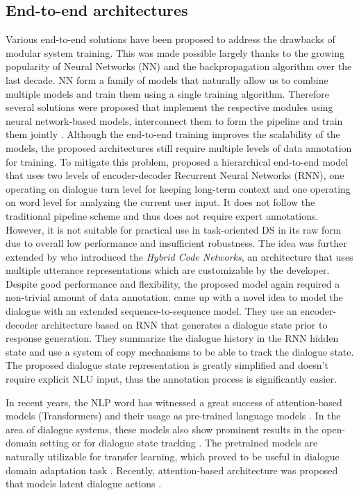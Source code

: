 \subsection{End-to-end architectures}
\label{sec:relwork-end-to-end}
Various end-to-end solutions have been proposed to address the drawbacks of modular system training.
This was made possible largely thanks to the growing popularity of Neural Networks (NN) and the backpropagation algorithm over the last decade.
NN form a family of models that naturally allow us to combine multiple models and train them using a single training algorithm.
Therefore several solutions were proposed that implement the respective modules using neural network-based models, interconnect them to form the pipeline and train them jointly \cite{li-etal-2017-end,wen-etal-2017-network}.
Although the end-to-end training improves the scalability of the models, the proposed architectures still require multiple levels of data annotation for training.
To mitigate this problem, \citet{serban2016building} proposed a hierarchical end-to-end model that uses two levels of encoder-decoder Recurrent Neural Networks (RNN), one operating on dialogue turn level for keeping long-term context and one operating on word level for analyzing the current user input.
It does not follow the traditional pipeline scheme and thus does not require expert annotations.
However, it is not suitable for practical use in task-oriented DS in its raw form due to overall low performance and insufficient robustness.
The idea was further extended by \citet{williams2017hybrid} who introduced the \textit{Hybrid Code Networks}, an architecture that uses multiple utterance representations which are customizable by the developer.
Despite good performance and flexibility, the proposed model again required a non-trivial amount of data annotation.
\citet{lei2018sequicity} came up with a novel idea to model the dialogue with an extended sequence-to-sequence model.
\label{sec:sequicity}
They use an encoder-decoder architecture based on RNN that generates a dialogue state prior to response generation.
They summarize the dialogue history in the RNN hidden state and use a system of copy mechanisms to be able to track the dialogue state.
The proposed dialogue state representation is greatly simplified and doesn't require explicit NLU input, thus the annotation process is significantly easier.

In recent years, the NLP word has witnessed a great success of attention-based models (Transformers) \cite{vaswani2017attention} and their usage as pre-trained language models \cite{devlin-etal-2019-bert}.
In the area of dialogue systems, these models also show prominent results in the open-domain setting \cite{DBLP:journals/corr/abs-1901-08149} or for dialogue state tracking \cite{chao2019bert}.
The pretrained models are naturally utilizable for transfer learning, which proved to be useful in dialogue domain adaptation task \cite{shalyminov-etal-2019-shot}.
Recently, attention-based architecture was proposed that models latent dialogue actions \cite{bao2019plato}.
\
